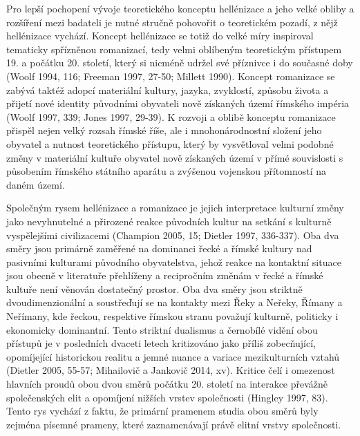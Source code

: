 Pro lepší pochopení vývoje teoretického konceptu hellénizace a jeho velké obliby a rozšíření mezi badateli je nutné stručně pohovořit o teoretickém pozadí, z nějž hellénizace vychází. Koncept hellénizace se totiž do velké míry inspiroval tematicky spřízněnou romanizací, tedy velmi oblíbeným teoretickým přístupem 19. a počátku 20. století, který si nicméně udržel své příznivce i do současné doby (Woolf 1994, 116; Freeman 1997, 27-50; Millett 1990). Koncept romanizace se zabývá taktéž adopcí materiální kultury, jazyka, zvyklostí, způsobu života a přijetí nové identity původními obyvateli nově získaných území římského impéria (Woolf 1997, 339; Jones 1997, 29-39). K rozvoji a oblibě konceptu romanizace přispěl nejen velký rozsah římské říše, ale i mnohonárodnostní složení jeho obyvatel a nutnost teoretického přístupu, který by vysvětloval velmi podobné změny v materiální kultuře obyvatel nově získaných území v přímé souvislosti s působením římského státního aparátu a zvýšenou vojenskou přítomností na daném území.

Společným rysem hellénizace a romanizace je jejich interpretace kulturní změny jako nevyhnutelné a přirozené reakce původních kultur na setkání s kulturně vyspělejšími civilizacemi (Champion 2005, 15; Dietler 1997, 336-337). Oba dva směry jsou primárně zaměřené na dominanci řecké a římské kultury nad pasivními kulturami původního obyvatelstva, jehož reakce na kontaktní situace jsou obecně v literatuře přehlíženy a recipročním změnám v řecké a římské kultuře není věnován dostatečný prostor. Oba dva směry jsou striktně dvoudimenzionální a soustřeďují se na kontakty mezi Řeky a Neřeky, Římany a Neřímany, kde řeckou, respektive římskou stranu považují kulturně, politicky i ekonomicky dominantní. Tento striktní dualismus a černobílé vidění obou přístupů je v posledních dvaceti letech kritizováno jako příliš zobecňující, opomíjející historickou realitu a jemné nuance a variace mezikulturních vztahů (Dietler 2005, 55-57; Mihailovič a Jankovič 2014, xv). Kritice čelí i omezenost hlavních proudů obou dvou směrů počátku 20. století na interakce převážně společenských elit a opomíjení nižších vrstev společnosti (Hingley 1997, 83). Tento rys vychází z faktu, že primární pramenem studia obou směrů byly zejména písemné prameny, které zaznamenávají právě elitní vrstvy společnosti.

